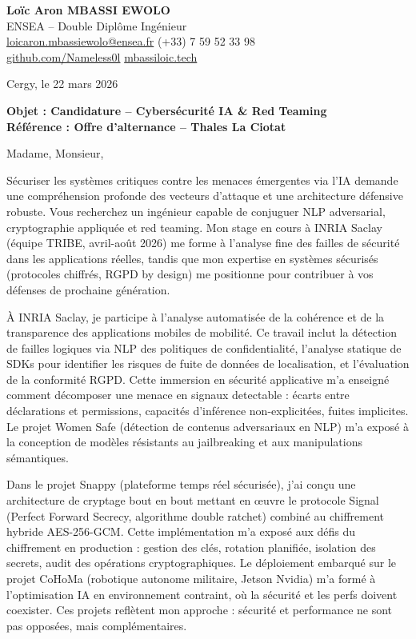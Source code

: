 \documentclass[a4paper,11pt]{article}
\begin{document}
\noindent
\textbf{Loïc Aron MBASSI EWOLO} \\
ENSEA -- Double Diplôme Ingénieur \\
\href{mailto:loicaron.mbassiewolo@ensea.fr}{loicaron.mbassiewolo@ensea.fr} \quad (+33) 7 59 52 33 98 \\
\href{https://github.com/Nameless0l}{github.com/Nameless0l} \quad \href{https://mbassiloic.tech}{mbassiloic.tech}

\vspace{1em}
\noindent Cergy, le 22 mars 2026

\vspace{1em}
\noindent
\textbf{Objet : Candidature -- Cybersécurité IA \& Red Teaming} \\
\textbf{Référence : Offre d'alternance -- Thales La Ciotat}

\vspace{1.5em}
\noindent Madame, Monsieur,

\vspace{0.8em}
Sécuriser les systèmes critiques contre les menaces émergentes via l'IA demande une compréhension profonde des vecteurs d'attaque et une architecture défensive robuste. Vous recherchez un ingénieur capable de conjuguer NLP adversarial, cryptographie appliquée et red teaming. Mon stage en cours à INRIA Saclay (équipe TRIBE, avril-août 2026) me forme à l'analyse fine des failles de sécurité dans les applications réelles, tandis que mon expertise en systèmes sécurisés (protocoles chiffrés, RGPD by design) me positionne pour contribuer à vos défenses de prochaine génération.

\vspace{0.8em}
À INRIA Saclay, je participe à l'analyse automatisée de la cohérence et de la transparence des applications mobiles de mobilité. Ce travail inclut la détection de failles logiques via NLP des politiques de confidentialité, l'analyse statique de SDKs pour identifier les risques de fuite de données de localisation, et l'évaluation de la conformité RGPD. Cette immersion en sécurité applicative m'a enseigné comment décomposer une menace en signaux detectable : écarts entre déclarations et permissions, capacités d'inférence non-explicitées, fuites implicites. Le projet Women Safe (détection de contenus adversariaux en NLP) m'a exposé à la conception de modèles résistants au jailbreaking et aux manipulations sémantiques.

\vspace{0.8em}
Dans le projet Snappy (plateforme temps réel sécurisée), j'ai conçu une architecture de cryptage bout en bout mettant en œuvre le protocole Signal (Perfect Forward Secrecy, algorithme double ratchet) combiné au chiffrement hybride AES-256-GCM. Cette implémentation m'a exposé aux défis du chiffrement en production : gestion des clés, rotation planifiée, isolation des secrets, audit des opérations cryptographiques. Le déploiement embarqué sur le projet CoHoMa (robotique autonome militaire, Jetson Nvidia) m'a formé à l'optimisation IA en environnement contraint, où la sécurité et les perfs doivent coexister. Ces projets reflètent mon approche : sécurité et performance ne sont pas opposées, mais complémentaires.
\end{document}
